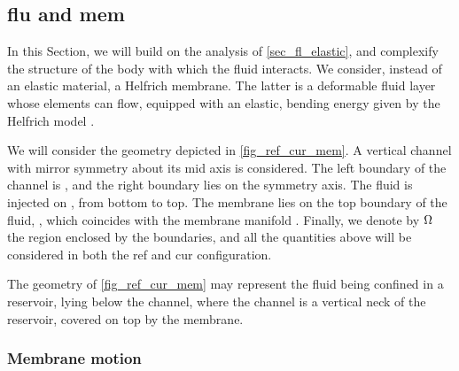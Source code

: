 
\subsection{\Acl{flu} and \acl{mem}}\label{sec_fl_mem}

In this Section, we will build on the analysis of \cref{sec_fl_elastic}, and complexify the structure of the body with which the fluid interacts. We consider, instead of an elastic material, a Helfrich membrane. The latter is a deformable fluid layer whose elements can flow, equipped with an elastic, bending energy given by the Helfrich model \cite{helfrichElasticPropertiesLipid1973,derenyiFormationInteractionMembrane2002}.

We will consider the  geometry depicted in \cref{fig_ref_cur_mem}. A vertical channel with mirror symmetry about its mid axis is considered. The left boundary of the channel is \pomin{}, and the right boundary \pomout{} lies on the symmetry axis. The fluid is injected  on \pombottom, from bottom to top. The membrane lies on the top boundary of the fluid, \pomtop{}, which  coincides with the membrane manifold \pomline{}. Finally, we denote by $\Omega$ the region enclosed by the boundaries, and all the quantities above will be considered in both the \ac{ref} and \ac{cur} configuration.

The geometry of \cref{fig_ref_cur_mem} may represent the fluid being confined in a  reservoir, lying below the channel, where the channel is a vertical neck of the reservoir, covered on top by the membrane.

\subsubsection{Membrane motion}
\label{sec_fl_mem_mem}

